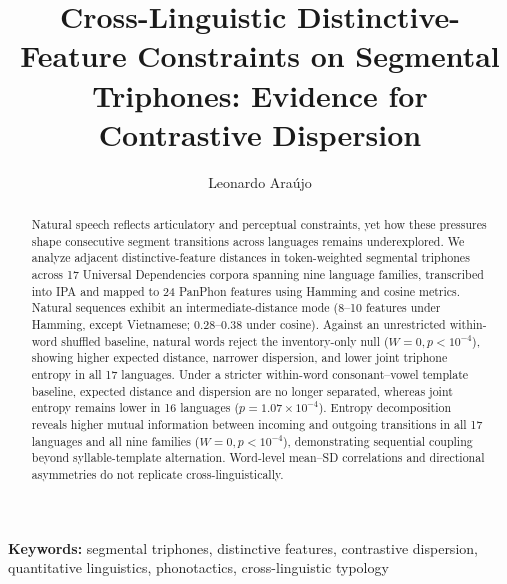 \documentclass[11pt,a4paper,leqno]{article}
\begin{document}
\doublespace

\title{Cross-Linguistic Distinctive-Feature Constraints on Segmental Triphones: Evidence for Contrastive Dispersion}

\author[1]{Leonardo Ara\'{u}jo}
\affil[ ]{ }

\date{}

\maketitle

\bigskip
\bigskip

\begin{abstract}
Natural speech reflects articulatory and perceptual constraints, yet how these pressures shape consecutive segment transitions across languages remains underexplored. We analyze adjacent distinctive-feature distances in token-weighted segmental triphones across 17 Universal Dependencies corpora spanning nine language families, transcribed into IPA and mapped to 24 PanPhon features using Hamming and cosine metrics. Natural sequences exhibit an intermediate-distance mode (8--10 features under Hamming, except Vietnamese; 0.28--0.38 under cosine). Against an unrestricted within-word shuffled baseline, natural words reject the inventory-only null ($W=0, p < 10^{-4}$), showing higher expected distance, narrower dispersion, and lower joint triphone entropy in all 17 languages. Under a stricter within-word consonant--vowel template baseline, expected distance and dispersion are no longer separated, whereas joint entropy remains lower in 16 languages ($p = 1.07 \times 10^{-4}$). Entropy decomposition reveals higher mutual information between incoming and outgoing transitions in all 17 languages and all nine families ($W=0, p < 10^{-4}$), demonstrating sequential coupling beyond syllable-template alternation. Word-level mean--SD correlations and directional asymmetries do not replicate cross-linguistically.
\end{abstract}

\bigskip

\noindent\textbf{Keywords:} segmental triphones, distinctive features, contrastive dispersion, quantitative linguistics, phonotactics, cross-linguistic typology
\end{document}
